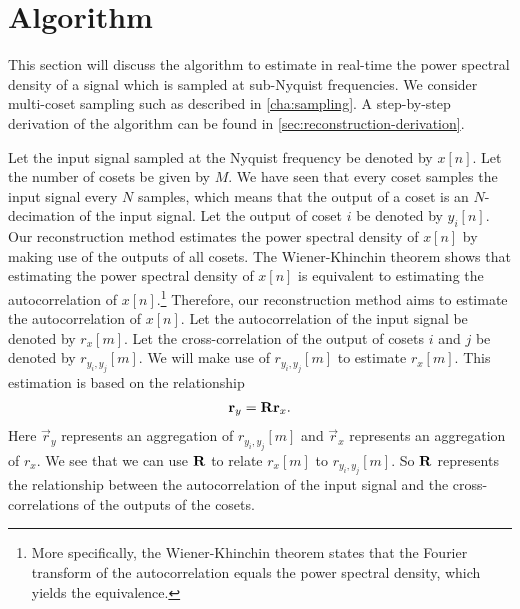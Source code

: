 \documentclass[a4paper, openany, oneside]{memoir}
\begin{document}
\section{Algorithm}
\label{sec:reconstruction-algorithm}
This section will discuss the algorithm to estimate in real-time the power spectral density of a signal which is sampled at sub-Nyquist frequencies. We consider multi-coset sampling such as described in \cref{cha:sampling}. A step-by-step derivation of the algorithm can be found in \cref{sec:reconstruction-derivation}.

Let the input signal sampled at the Nyquist frequency be denoted by $x[n]$. Let the number of cosets be given by $M$. We have seen that every coset samples the input signal every $N$ samples, which means that the output of a coset is an $N$-decimation of the input signal. Let the output of coset $i$ be denoted by $y_i[n]$. Our reconstruction method estimates the power spectral density of $x[n]$ by making use of the outputs of all cosets. The Wiener-Khinchin theorem shows that estimating the power spectral density of $x[n]$ is equivalent to estimating the autocorrelation of $x[n]$.\footnote{More specifically, the Wiener-Khinchin theorem states that the Fourier transform of the autocorrelation equals the power spectral density, which yields the equivalence.} Therefore, our reconstruction method aims to estimate the autocorrelation of $x[n]$. Let the autocorrelation of the input signal be denoted by $r_x[m]$. Let the cross-correlation of the output of cosets $i$ and $j$ be denoted by $r_{y_i,y_j}[m]$. We will make use of $r_{y_i,y_j}[m]$ to estimate $r_x[m]$. This estimation is based on the relationship
\begin{align*}
    \boldsymbol{\mathbf{r}}_{y} = \boldsymbol{\mathbf{R}} \boldsymbol{\mathbf{r}}_x.
\end{align*}
Here $\vec{r}_y$ represents an aggregation of $r_{y_i,y_j}[m]$ and $\vec{r}_x$ represents an aggregation of $r_x$. We see that we can use $\boldsymbol{\mathbf{R}}$ to relate $r_x[m]$ to $r_{y_i,y_j}[m]$. So $\boldsymbol{\mathbf{R}}$ represents the relationship between the autocorrelation of the input signal and the cross-correlations of the outputs of the cosets.
\end{document}
